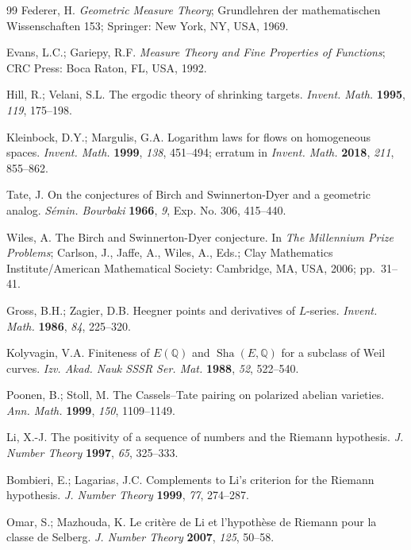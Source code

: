 \documentclass[11pt,reqno]{amsart}
\theoremstyle{remark}
\newcommand{\Q}{\mathbb{Q}}
\newcommand{\ShaE}{\mathop{\mathrm{Sha}}}
\begin{document}
\begin{thebibliography}{99}
Federer, H. \emph{Geometric Measure Theory}; Grundlehren der mathematischen Wissenschaften 153; Springer: New York, NY, USA, 1969.

Evans, L.C.; Gariepy, R.F. \emph{Measure Theory and Fine Properties of Functions}; CRC Press: Boca Raton, FL, USA, 1992.

Hill, R.; Velani, S.L. The ergodic theory of shrinking targets. \emph{Invent. Math.} \textbf{1995}, \emph{119}, 175--198.

Kleinbock, D.Y.; Margulis, G.A. Logarithm laws for flows on homogeneous spaces. \emph{Invent. Math.} \textbf{1999}, \emph{138}, 451--494; erratum in \emph{Invent. Math.} \textbf{2018}, \emph{211}, 855--862.

Tate, J. On the conjectures of Birch and Swinnerton-Dyer and a geometric analog. \emph{S\'emin. Bourbaki} \textbf{1966}, \emph{9}, Exp. No. 306, 415--440.

Wiles, A. The Birch and Swinnerton-Dyer conjecture. In \emph{The Millennium Prize Problems}; Carlson, J., Jaffe, A., Wiles, A., Eds.; Clay Mathematics Institute/American Mathematical Society: Cambridge, MA, USA, 2006; pp.~31--41.

Gross, B.H.; Zagier, D.B. Heegner points and derivatives of $L$-series. \emph{Invent. Math.} \textbf{1986}, \emph{84}, 225--320.

Kolyvagin, V.A. Finiteness of $E(\Q)$ and $\ShaE(E,\Q)$ for a subclass of Weil curves. \emph{Izv. Akad. Nauk SSSR Ser. Mat.} \textbf{1988}, \emph{52}, 522--540.

Poonen, B.; Stoll, M. The Cassels--Tate pairing on polarized abelian varieties. \emph{Ann. Math.} \textbf{1999}, \emph{150}, 1109--1149.

Li, X.-J. The positivity of a sequence of numbers and the Riemann hypothesis. \emph{J. Number Theory} \textbf{1997}, \emph{65}, 325--333.

Bombieri, E.; Lagarias, J.C. Complements to Li's criterion for the Riemann hypothesis. \emph{J. Number Theory} \textbf{1999}, \emph{77}, 274--287.

Omar, S.; Mazhouda, K. Le crit\`ere de Li et l'hypoth\`ese de Riemann pour la classe de Selberg. \emph{J. Number Theory} \textbf{2007}, \emph{125}, 50--58.


\end{thebibliography}
\end{document}
